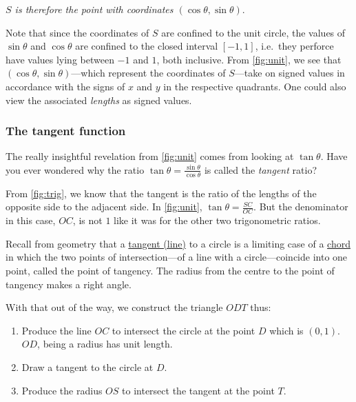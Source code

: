 \documentclass[
  a4paper,
]{article}
\providecommand{\tightlist}{%
  \setlength{\itemsep}{0pt}\setlength{\parskip}{0pt}}
\begin{document}
\emph{\(S\) is therefore the point with coordinates
\((\cos\theta, \sin\theta)\)}.

Note that since the coordinates of \(S\) are confined to the unit
circle, the values of \(\sin\theta\) and \(\cos\theta\) are confined to
the closed interval \([-1, 1]\), i.e.~they perforce have values lying
between \(-1\) and \(1\), both inclusive. From \cref{fig:unit}, we see
that \((\cos\theta, \sin\theta)\)---which represent the coordinates of
\(S\)---take on signed values in accordance with the signs of \(x\) and
\(y\) in the respective quadrants. One could also view the associated
\emph{lengths} as signed values.

\hypertarget{the-tangent-function}{%
\subsubsection{The tangent function}\label{the-tangent-function}}

The really insightful revelation from \cref{fig:unit} comes from looking
at \(\tan\theta\). Have you ever wondered why the ratio
\(\tan\theta = \frac{\sin\theta}{\cos\theta}\) is called the
\emph{tangent} ratio?

From \cref{fig:trig}, we know that the tangent is the ratio of the
lengths of the opposite side to the adjacent side. In \cref{fig:unit},
\(\tan\theta = \frac{SC}{OC}\). But the denominator in this case,
\(OC\), is not \(1\) like it was for the other two trigonometric ratios.

Recall from geometry that a
\href{https://en.wikipedia.org/wiki/Tangent_lines_to_circles}{tangent
(line)} to a circle is a limiting case of a
\href{https://en.wikipedia.org/wiki/Chord_(geometry)}{chord} in which
the two points of intersection---of a line with a circle---coincide into
one point, called the point of tangency. The radius from the centre to
the point of tangency makes a right angle.

With that out of the way, we construct the triangle \(ODT\) thus:

\begin{enumerate}
\def\labelenumi{\alph{enumi}.}
\tightlist
\item
  Produce the line \(OC\) to intersect the circle at the point \(D\)
  which is \((0, 1)\). \(OD\), being a radius has unit length.
\item
  Draw a tangent to the circle at \(D\).
\item
  Produce the radius \(OS\) to intersect the tangent at the point \(T\).
\end{enumerate}
\end{document}
